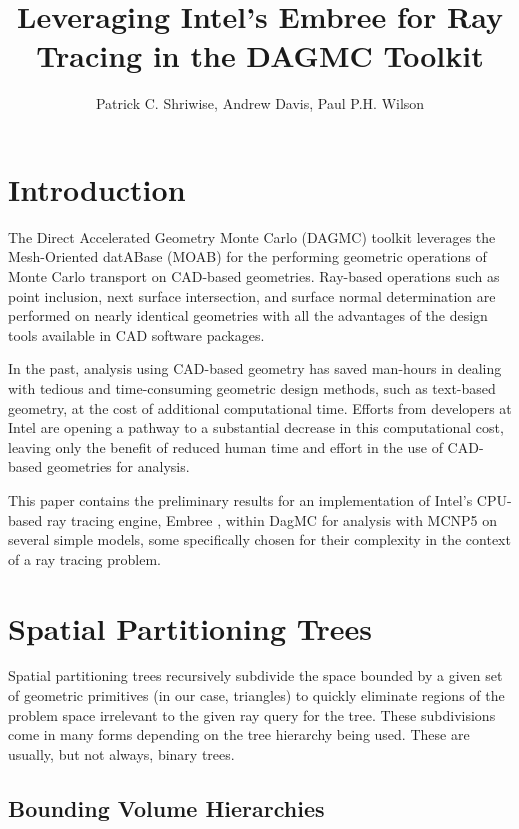 \documentclass{anstrans}
\title{Leveraging Intel's Embree for Ray Tracing in the DAGMC Toolkit}
\author{Patrick C. Shriwise, Andrew Davis, Paul P.H. Wilson}
\institute{Department of Nuclear Engineering $\&$ Engineering Physics, University of Wisconsin-Madison, 1500 Engineering Dr, Madison, WI 53706, shriwise@wisc.edu}
\begin{document}
\section{Introduction}

The Direct Accelerated Geometry Monte Carlo (DAGMC) \cite{dagmc_2009} toolkit leverages the Mesh-Oriented datABase (MOAB) \cite{moab} for the performing geometric operations of Monte Carlo transport on CAD-based geometries. Ray-based operations such as point inclusion, next surface intersection, and surface normal determination are performed on nearly identical geometries with all the advantages of the design tools available in CAD software packages.

In the past, analysis using CAD-based geometry has saved man-hours in dealing with tedious and time-consuming geometric design methods, such as text-based geometry, at the cost of additional computational time. Efforts from developers at Intel are opening a pathway to a substantial decrease in this computational cost, leaving only the benefit of reduced human time and effort in the use of CAD-based geometries for analysis. 

This paper contains the preliminary results for an implementation of Intel's CPU-based ray tracing engine, Embree \cite{embree}, within DagMC for analysis with MCNP5 \cite{mcnp5} on several simple models, some specifically chosen for their complexity in the context of a ray tracing problem.

\section{Spatial Partitioning Trees}

Spatial partitioning trees recursively subdivide the space bounded by a given set of geometric primitives (in our case, triangles) to quickly eliminate regions of the problem space irrelevant to the given ray query for the tree. These subdivisions come in many forms depending on the tree hierarchy being used. These are usually, but not always, binary trees.

\subsection{Bounding Volume Hierarchies}
\end{document}
